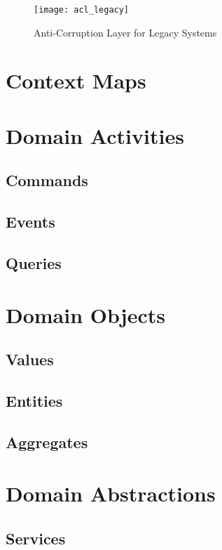 \begin{figure}[ht]
\caption{Anti-Corruption Layer for Legacy Systems}
\centering
\texttt{[image: acl\_legacy]}
 \label{fig:acllegacy}
\end{figure}

\section{Context Maps}

\section{Domain Activities}

\subsection{Commands}

\subsection{Events}

\subsection{Queries}

\section{Domain Objects}

\subsection{Values}

\subsection{Entities}

\subsection{Aggregates}

\section{Domain Abstractions}

\subsection{Services}

